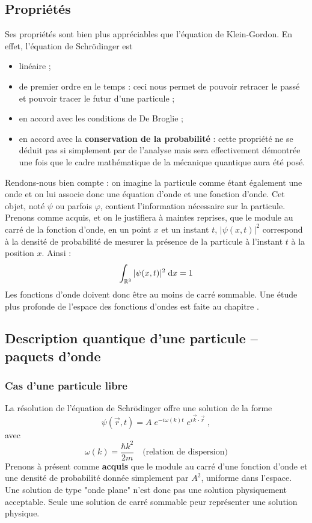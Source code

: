 \documentclass[12pt, a4paper]{book}
\begin{document}
\subsection{Propriétés}
Ses propriétés sont bien plus appréciables que l'équation de Klein-Gordon. En effet, l'équation de Schrödinger est 
\begin{itemize}
\item linéaire ;
\item de premier ordre en le temps : ceci nous permet de pouvoir retracer le passé et pouvoir tracer le futur d'une particule ;
\item en accord avec les conditions de De Broglie ;
\item en accord avec la \textbf{conservation de la probabilité} : cette propriété ne se déduit pas si simplement par de l'analyse mais sera effectivement démontrée une fois que le cadre mathématique de la mécanique quantique aura été posé.
\end{itemize}
Rendons-nous bien compte : on imagine la particule comme étant également une onde et on lui associe donc une équation d'onde et une fonction d'onde. Cet objet, noté $\psi$ ou parfois $\varphi$, contient l'information nécessaire sur la particule. Prenons comme acquis, et on le justifiera à maintes reprises, que le module au carré de la fonction d'onde, en un point $x$ et un instant $t$, $|\psi(x,t)|^2$ correspond à la densité de probabilité de mesurer la présence de la particule à l'instant $t$ à la position $x$. Ainsi : 
\begin{equation}
  \int_{\mathbb{R}^3} |\psi(x,t)|^2 \; \mathrm{d}x = 1
\end{equation}
Les fonctions d'onde doivent donc être au moins de carré sommable. Une étude plus profonde de l'espace des fonctions d'ondes est faite au chapitre .

\subsection{Description quantique d'une particule -- paquets d'onde}
\subsubsection{Cas d'une particule libre}
La résolution de l'équation de Schrödinger offre une solution de la forme 
\begin{equation}\label{eq:solution_schrod}
\psi(\vec r, t) = A \; e^{-i\omega(k) t} \; e ^{i \vec k \cdot \vec r} \; ,
\end{equation}
avec 
\begin{equation}\label{eq:relation_dispersion}
\omega(k) = \dfrac{\hbar k^2}{2m} \quad \text{(relation de dispersion)}
\end{equation}
Prenons à présent comme \textbf{acquis} que le module au carré d'une fonction d'onde
et une densité de probabilité donnée simplement par $A^2$, uniforme dans l'espace. Une solution de type "onde plane" n'est donc pas une solution physiquement acceptable. Seule une solution de carré sommable peur représenter une solution physique.
\end{document}
